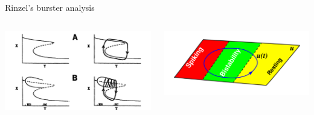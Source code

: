 \documentclass{beamer}
\begin{document}
\begin{frame}[label={sec:org56adf05}]{Rinzel's burster analysis}
\begin{columns}
\begin{column}{0.5\columnwidth}
\begin{center}
\includegraphics[width=\textwidth]{rinzburst.png}
\end{center}
\end{column}

\begin{column}{0.5\columnwidth}
\begin{center}
\includegraphics[width=\textwidth]{bursterschematic.png}
\end{center}
\end{column}
\end{columns}
\end{frame}
\end{document}
